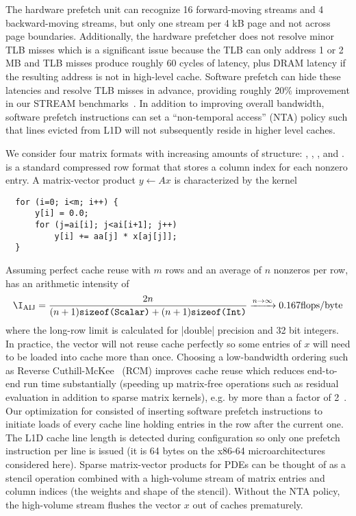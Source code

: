 The hardware prefetch unit can recognize 16 forward-moving streams and 4 backward-moving streams, but only one stream per 4 kB page and not across page boundaries.
Additionally, the hardware prefetcher does not resolve minor TLB misses which is a significant issue because the TLB can only address 1 or 2 MB and TLB misses produce roughly 60 cycles of latency, plus DRAM latency if the resulting address is not in high-level cache.
Software prefetch can hide these latencies and resolve TLB misses in advance, providing roughly 20\% improvement in our STREAM benchmarks~\cite{mccalpin2007stream}.
In addition to improving overall bandwidth, software prefetch instructions can set a ``non-temporal access'' (NTA) policy such that lines evicted from L1D will not subsequently reside in higher level caches.

We consider four matrix formats with increasing amounts of structure: {\AIJ}, {\AIJInode}, {\BAIJ}, and {\SBAIJ}.
{\AIJ} is a standard compressed row format that stores a column index for each nonzero entry.
A matrix-vector product $y \gets A x$ is characterized by the kernel
\begin{verbatim}
  for (i=0; i<m; i++) {
      y[i] = 0.0;
      for (j=ai[i]; j<ai[i+1]; j++)
          y[i] += aa[j] * x[aj[j]];
  }
\end{verbatim}
Assuming perfect cache reuse with $m$ rows and an average of $n$ nonzeros per row, {\MatMult} has an arithmetic intensity of
\begin{align*}
  \I_{\text{AIJ}} = \frac{2n}{(n+1)\texttt{sizeof(Scalar)} + (n+1)\texttt{sizeof(Int)}} \xrightarrow{n\to\infty} 0.167 \text{flops/byte}
\end{align*}
where the long-row limit is calculated for \cverb|double| precision and 32 bit integers.
In practice, the vector will not reuse cache perfectly so some entries of $x$ will need to be loaded into cache more than once.
Choosing a low-bandwidth ordering such as Reverse Cuthill-McKee~\cite{cuthill1969reducing} (RCM) improves cache reuse which reduces end-to-end run time substantially (speeding up matrix-free operations such as residual evaluation in addition to sparse matrix kernels), e.g. by more than a factor of 2~\cite{gropp2000pmt}.
Our optimization for {\AIJ} consisted of inserting software prefetch instructions to initiate loads of every cache line holding entries in the row after the current one.
The L1D cache line length is detected during configuration so only one prefetch instruction per line is issued (it is 64 bytes on the x86-64 microarchitectures considered here).
Sparse matrix-vector products for PDEs can be thought of as a stencil operation combined with a high-volume stream of matrix entries and column indices (the weights and shape of the stencil).
Without the NTA policy, the high-volume stream flushes the vector $x$ out of caches prematurely.

